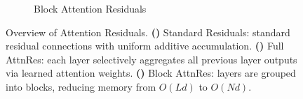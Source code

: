 \begin{figure}[b!]
\begin{subfigure}[b]{0.38\textwidth}
{%
    }
    \caption{Block Attention Residuals}
    \label{fig:teaser-block}
  \end{subfigure}

  \caption{
    Overview of Attention Residuals.
    \textbf{()} Standard Residuals: standard residual connections with uniform additive accumulation.
    \textbf{()} Full AttnRes: each layer selectively aggregates all previous layer outputs via learned attention weights.
    \textbf{()} Block AttnRes: layers are grouped into blocks, reducing memory from $O(Ld)$ to $O(Nd)$.
  }
  \label{fig:teaser}
\end{figure}
